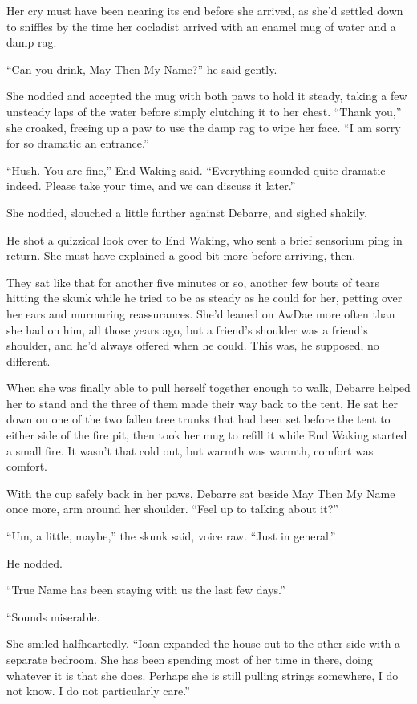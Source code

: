 Her cry must have been nearing its end before she arrived, as she'd settled down to sniffles by the time her cocladist arrived with an enamel mug of water and a damp rag.

``Can you drink, May Then My Name?'' he said gently.

She nodded and accepted the mug with both paws to hold it steady, taking a few unsteady laps of the water before simply clutching it to her chest. ``Thank you,'' she croaked, freeing up a paw to use the damp rag to wipe her face. ``I am sorry for so dramatic an entrance.''

``Hush. You are fine,'' End Waking said. ``Everything sounded quite dramatic indeed. Please take your time, and we can discuss it later.''

She nodded, slouched a little further against Debarre, and sighed shakily.

He shot a quizzical look over to End Waking, who sent a brief sensorium ping in return. She must have explained a good bit more before arriving, then.

They sat like that for another five minutes or so, another few bouts of tears hitting the skunk while he tried to be as steady as he could for her, petting over her ears and murmuring reassurances. She'd leaned on AwDae more often than she had on him, all those years ago, but a friend's shoulder was a friend's shoulder, and he'd always offered when he could. This was, he supposed, no different.

When she was finally able to pull herself together enough to walk, Debarre helped her to stand and the three of them made their way back to the tent. He sat her down on one of the two fallen tree trunks that had been set before the tent to either side of the fire pit, then took her mug to refill it while End Waking started a small fire. It wasn't that cold out, but warmth was warmth, comfort was comfort.

With the cup safely back in her paws, Debarre sat beside May Then My Name once more, arm around her shoulder. ``Feel up to talking about it?''

``Um, a little, maybe,'' the skunk said, voice raw. ``Just in general.''

He nodded.

``True Name has been staying with us the last few days.''

``Sounds miserable.

She smiled halfheartedly. ``Ioan expanded the house out to the other side with a separate bedroom. She has been spending most of her time in there, doing whatever it is that she does. Perhaps she is still pulling strings somewhere, I do not know. I do not particularly care.''

